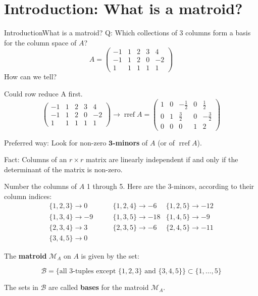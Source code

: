 \documentclass[%
	12pt]{beamer}
\theoremstyle{plain}
\theoremstyle{definition}
\DeclareMathOperator{\rref}{rref}
\begin{document}
\section{Introduction: What is a matroid?}

\begin{frame}{Introduction}{What is a matroid?}
{\color{powCol}Q:} Which collections of 3 columns form a basis for the column space of $A$?  
\[
A=
\begin{pmatrix}
-1 & 1 & 2 & 3 & 4 \\
-1 & 1 & 2 & 0 & -2 \\
1 & 1 & 1 & 1 & 1
\end{pmatrix}
\]
\pause How can we tell?
\end{frame}

\begin{frame}
Could row reduce A first.  
\[
\begin{pmatrix}
-1 & 1 & 2 & 3 & 4 \\
-1 & 1 & 2 & 0 & -2 \\
1 & 1 & 1 & 1 & 1
\end{pmatrix}
\to
\rref A = 
\begin{pmatrix}
1 & 0 & -\frac{1}{2} & 0 & \frac{1}{2} \\
0 & 1 & \frac{3}{2} & 0 & -\frac{3}{2} \\
0 & 0 & 0 & 1 & 2
\end{pmatrix}
\]

\pause 
\vspace{0.5pc}
Preferred way: Look for non-zero $\mathbf 3$\textbf{-minors} of $A$ (or of $\rref A$).  

\vspace{1pc}
{\color{powCol}Fact:} Columns of an $r\times r$ matrix are linearly independent if and only if the determinant of the matrix is non-zero.
\end{frame}

\begin{frame}
Number the columns of $A$ 1 through 5.  Here are the 3-minors, according to their column indices:
\begin{align*}
\{1,2,3\}\to 0 & \qquad \{1,2,4\}\to -6 & \{1,2,5\}\to -12 \\ 
\{1,3,4\}\to -9 & \qquad \{1,3,5\}\to -18 & \{1,4,5\}\to -9\\
\{2,3,4\}\to 3 & \qquad \{2,3,5\}\to -6 & \{2,4,5\}\to -11 \\
\{3,4,5\}\to 0 & & 
\end{align*}

\pause
\vspace{0.5pc}
The \textbf{matroid} $\mathscr M_A$ on $A$ is given by the set: 

\vspace{-1.75pc}
\[
\mathscr B = \{\text{all $3$-tuples except $\{1,2,3\}$ and $\{3,4,5\}$}\}\subset \{1,\dots,5\}
\]

\vspace{-0.5pc}
The sets in $\mathscr B$ are called \textbf{bases} for the matroid $\mathscr M_A$.
\end{frame}	
\end{document}
